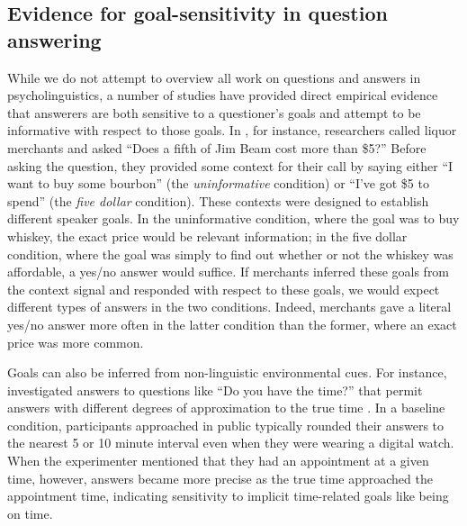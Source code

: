 \documentclass[11pt, floatsintext]{apa6}
\begin{document}
\subsection{Evidence for goal-sensitivity in question answering}

While we do not attempt to overview all work on questions and answers in psycholinguistics, a number of studies have provided direct empirical evidence that answerers are both sensitive to a questioner's goals and attempt to be informative with respect to those goals.
In , for instance, researchers called liquor merchants and asked ``Does a fifth of Jim Beam cost more than \$5?'' 
Before asking the question, they provided some context for their call by saying either ``I want to buy some bourbon'' (the \emph{uninformative} condition) or ``I've got \$5 to spend'' (the \emph{five dollar} condition). 
These contexts were designed to establish different speaker goals. 
In the uninformative condition, where the goal was to buy whiskey, the exact price would be relevant information; 
in the five dollar condition, where the goal was simply to find out whether or not the whiskey was affordable, a yes/no answer would suffice. 
If merchants inferred these goals from the context signal and responded with respect to these goals, we would expect different types of answers in the two conditions. 
Indeed, merchants gave a literal yes/no answer more often in the latter condition than the former, where an exact price was more common. 

Goals can also be inferred from non-linguistic environmental cues. 
For instance,  investigated answers to questions like ``Do you have the time?'' that permit answers with different degrees of approximation to the true time \cite<see also>{GibbsBryant08_OptimalRelevance}. 
In a baseline condition, participants approached in public typically rounded their answers to the nearest 5 or 10 minute interval even when they were wearing a digital watch. 
When the experimenter mentioned that they had an appointment at a given time, however, answers became more precise as the true time approached the appointment time, indicating sensitivity to implicit time-related goals like being on time.  
\end{document}
